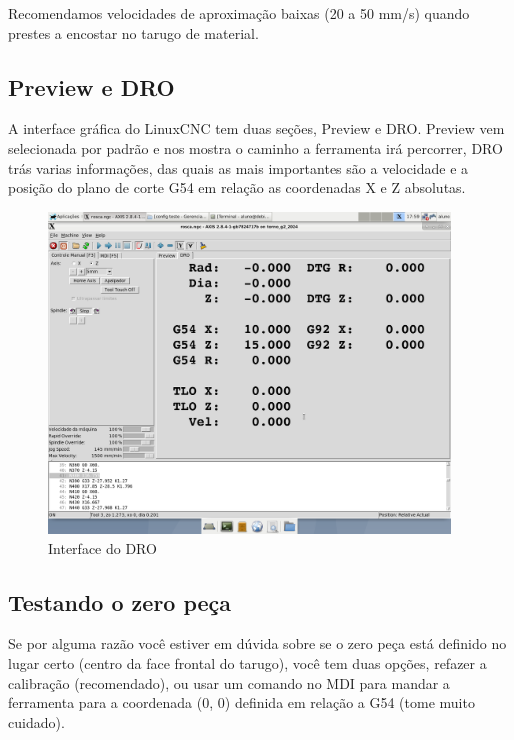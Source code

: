 \documentclass[twoside,a4paper]{refart}
\begin{document}
\attention Recomendamos velocidades de aproximação baixas (20 a 50 mm/s) quando prestes a encostar no tarugo de material.

\subsection{Preview e DRO}

A interface gráfica do LinuxCNC tem duas seções, Preview e DRO. Preview vem selecionada por padrão e nos mostra o caminho a ferramenta irá percorrer, DRO trás varias informações, das quais as mais importantes são a velocidade e a posição do plano de corte G54 em relação as coordenadas X e Z absolutas.

\begin{figure}[H]
    \begin{center}
        \includegraphics[width=0.95\textwidth]{imagens/configuracao_de_posicao.png}
    \end{center}
    \caption{Interface do DRO}\label{pos}
\end{figure}

\subsection{Testando o zero peça}

Se por alguma razão você estiver em dúvida sobre se o zero peça está definido no lugar certo (centro da face frontal do tarugo), você tem duas opções, refazer a calibração (recomendado), ou usar um comando no MDI para mandar a ferramenta para a coordenada (0, 0) definida em relação a G54 (tome muito cuidado).
\end{document}
